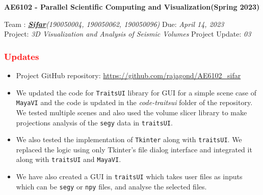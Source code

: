 \documentclass[11pt,a4paper]{article}
\newcommand{\student}{\textbf{\textit{\href{https://github.com/rajagond/AE6102_sifar}{Sifar}}}}
\begin{document}
\noindent\fbox
{
\begin{minipage}{\dimexpr\textwidth-2\fboxsep-2\fboxrule\relax}
\vspace{0.5cm}
\begin{center}
    

	{\bf\Large AE6102 - Parallel Scientific Computing and Visualization(Spring 2023)}\\
        \vspace*{0.2cm}
\end{center}
\noindent

Team   : \student \textit{(190050004, 190050062, 190050096)} \hfill Due: \textit{April 14, 2023}\\[0.1cm]
Project: \textit{3D Visualization and Analysis of Seismic Volumes} \hfill Project Update: \textit{03}
 \vspace*{0.2cm}       
\end{minipage}
}


\subsubsection*{\textcolor{red}{Updates}}
\begin{itemize}
    \item Project GitHub repository: \url{https://github.com/rajagond/AE6102_sifar}
    \item We updated the code for \verb|TraitsUI| library for GUI for a simple scene case of \verb|MayaVI| and the code is updated in the \textit{code-traitsui} folder of the repository. We tested multiple scenes and also used the volume slicer library to make projections analysis of the \verb|segy| data in \verb|traitsUI|.
    
    \item We also tested the implementation of \verb|Tkinter| along with \verb|traitsUI|. We replaced the logic using only Tkinter's file dialog interface and integrated it along with \verb|traitsUI| and \verb|MayaVI|.
    
    \item We have also created a GUI in \verb|traitsUI| which takes user files as inputs which can be \verb|segy| or \verb|npy| files, and analyse the selected files. 
\end{itemize}
\end{document}
